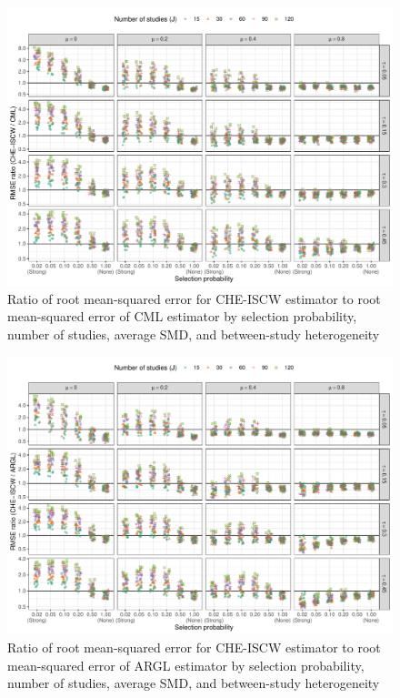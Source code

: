 \documentclass[
  american,
  man, donotrepeattitle,mask,floatsintext]{apa7}
\numberwithin{table}{section}
\numberwithin{equation}{section}
\numberwithin{figure}{section}
\begin{document}
\begin{figure}
\includegraphics{step-function-selection-models-supplementary-materials_files/figure-latex/rmse-CHE-CML-1} \caption{Ratio of root mean-squared error for CHE-ISCW estimator to root mean-squared error of CML estimator by selection probability, number of studies, average SMD, and between-study heterogeneity}\label{fig:rmse-CHE-CML}
\end{figure}

\begin{figure}
\includegraphics{step-function-selection-models-supplementary-materials_files/figure-latex/rmse-CHE-ARGL-1} \caption{Ratio of root mean-squared error for CHE-ISCW estimator to root mean-squared error of ARGL estimator by selection probability, number of studies, average SMD, and between-study heterogeneity}\label{fig:rmse-CHE-ARGL}
\end{figure}
\end{document}
